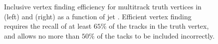 \begin{figure}[!htbp]
\begin{subfigure}[b]{0.48\textwidth}
    \end{subfigure}
    \caption{Inclusive vertex finding efficiency for multitrack truth vertices in \ttbarbjets (left) and \Zprimejets (right) as a function of jet \pt. Efficient vertex finding requires the recall of at least $65\%$ of the tracks in the truth vertex, and allows no more than $50\%$ of the tacks to be included incorrectly.}
    \label{fig:zprime_vert_eff}
\end{figure}


%
%
